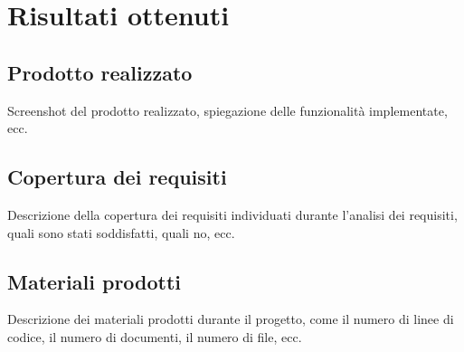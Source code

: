 \section{Risultati ottenuti}
\label{sez:risultati-ottenuti}


\subsection{Prodotto realizzato}
\label{subsec:prodotto-realizzato}

Screenshot del prodotto realizzato, spiegazione delle funzionalità implementate, ecc.

\subsection{Copertura dei requisiti}
\label{subsec:copertura-requisiti}

Descrizione della copertura dei requisiti individuati durante l'analisi dei requisiti, quali sono stati soddisfatti, quali no, ecc.

\subsection{Materiali prodotti}
\label{subsec:materiali-prodotti}

Descrizione dei materiali prodotti durante il progetto, come il numero di linee di codice, il numero di documenti, il numero di file, ecc.\\